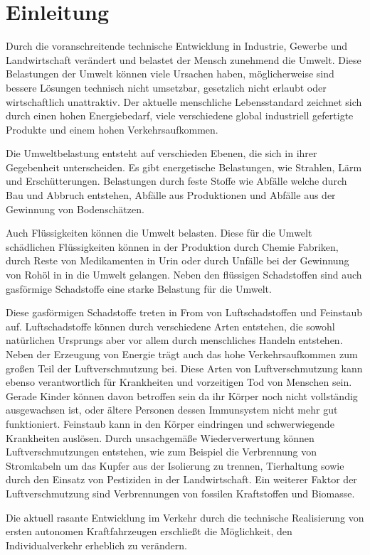 \chapter{Einleitung}
Durch die voranschreitende technische Entwicklung in Industrie, Gewerbe und Landwirtschaft verändert und belastet der Mensch zunehmend die Umwelt.
Diese Belastungen der Umwelt können viele Ursachen haben,
möglicherweise sind bessere Lösungen technisch nicht umsetzbar,
gesetzlich nicht erlaubt oder wirtschaftlich unattraktiv.
Der aktuelle menschliche Lebensstandard zeichnet sich durch einen
hohen Energiebedarf, viele verschiedene global industriell gefertigte Produkte
und einem hohen Verkehrsaufkommen.

Die Umweltbelastung entsteht auf verschieden Ebenen, die sich in ihrer Gegebenheit unterscheiden.
Es gibt energetische Belastungen, wie Strahlen, Lärm und Erschütterungen.
Belastungen durch feste Stoffe wie Abfälle welche durch Bau und Abbruch entstehen,
Abfälle aus Produktionen und
Abfälle aus der Gewinnung von Bodenschätzen.

Auch Flüssigkeiten können die Umwelt belasten.
Diese für die Umwelt schädlichen Flüssigkeiten können
in der Produktion durch Chemie Fabriken,
durch Reste von Medikamenten in Urin oder durch
Unfälle bei der Gewinnung von Rohöl in in die Umwelt gelangen.
Neben den flüssigen Schadstoffen sind auch gasförmige Schadstoffe eine starke Belastung für die Umwelt.

Diese gasförmigen Schadstoffe treten in From von Luftschadstoffen und Feinstaub auf.
Luftschadstoffe können durch verschiedene Arten entstehen, die sowohl natürlichen Ursprungs aber vor allem
durch menschliches Handeln entstehen.
Neben der Erzeugung von Energie trägt auch das hohe Verkehrsaufkommen zum großen Teil der Luftverschmutzung bei.
Diese Arten von Luftverschmutzung kann ebenso verantwortlich für Krankheiten und vorzeitigen Tod von Menschen sein.
Gerade Kinder können davon betroffen sein da ihr Körper noch nicht vollständig ausgewachsen ist,
oder ältere Personen dessen Immunsystem nicht mehr gut funktioniert.
Feinstaub kann in den Körper eindringen und schwerwiegende Krankheiten auslösen.
Durch unsachgemäße Wiederverwertung können Luftverschmutzungen entstehen,
wie zum Beispiel die Verbrennung von
Stromkabeln um das Kupfer aus der Isolierung zu trennen,
Tierhaltung sowie durch den Einsatz von Pestiziden in der Landwirtschaft.
Ein weiterer Faktor der Luftverschmutzung sind Verbrennungen von fossilen Kraftstoffen und Biomasse.

Die aktuell rasante Entwicklung im Verkehr durch die technische Realisierung von ersten autonomen Kraftfahrzeugen
erschließt die Möglichkeit, den Individualverkehr erheblich zu verändern.

